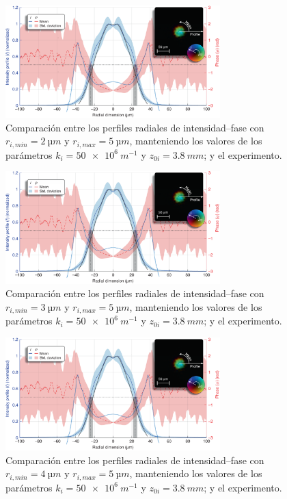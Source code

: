 \begin{figure}[htbp]
  \centering
  \includegraphics[width=0.74\textwidth]{Figuras/anx_cmp_13.png}
  \caption*{Comparación entre los perfiles radiales de intensidad--fase con $r_{i,min}=\qty{2}{µm}$ y $r_{i,max}=\qty{5}{µm}$, manteniendo los valores de los parámetros $k_{i}=\qty{50e6}{m^{-1}}$ y $z_{0i}=\qty{3.8}{mm}$; y el experimento.}
\end{figure}

\begin{figure}[htbp]
  \centering
  \includegraphics[width=0.74\textwidth]{Figuras/anx_cmp_14.png}
  \caption*{Comparación entre los perfiles radiales de intensidad--fase con $r_{i,min}=\qty{3}{µm}$ y $r_{i,max}=\qty{5}{µm}$, manteniendo los valores de los parámetros $k_{i}=\qty{50e6}{m^{-1}}$ y $z_{0i}=\qty{3.8}{mm}$; y el experimento.}
\end{figure}

\begin{figure}[htbp!]
  \centering
  \includegraphics[width=0.74\textwidth]{Figuras/anx_cmp_15.png}
  \caption*{Comparación entre los perfiles radiales de intensidad--fase con $r_{i,min}=\qty{4}{µm}$ y $r_{i,max}=\qty{5}{µm}$, manteniendo los valores de los parámetros $k_{i}=\qty{50e6}{m^{-1}}$ y $z_{0i}=\qty{3.8}{mm}$; y el experimento.}
\end{figure}

